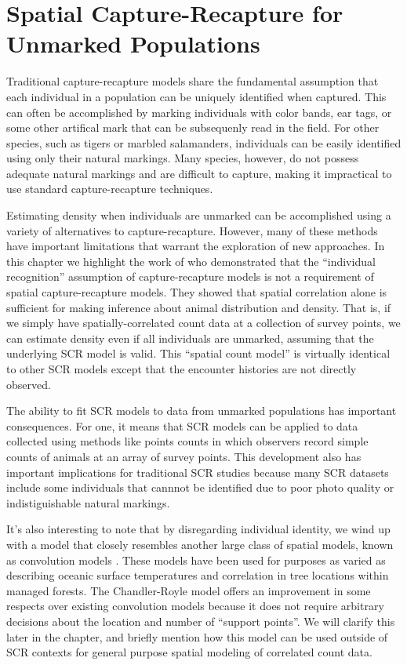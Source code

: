 


\chapter{Spatial Capture-Recapture for Unmarked Populations}
\label{Chapt.scr-unmarked}

\vspace{0.3cm}


Traditional capture-recapture models share the fundamental
assumption that each individual in a population can be uniquely
identified when captured. This can often be accomplished
by marking individuals with color bands, ear tags, or some other
artifical mark that can be subsequenly read in the field. For other species, such as
tigers or marbled salamanders, individuals can be easily identified
using only their natural markings. Many species, however,
do not possess adequate natural markings and are
difficult to capture, making it impractical to use standard
capture-recapture techniques.

Estimating density when individuals are unmarked can be accomplished
using a variety of alternatives to capture-recapture. However, many of
these methods have important limitations that warrant the exploration
of new approaches.
In this chapter we highlight the work of \citet{chandler_royle:2012}
who demonstrated that the ``individual recognition'' assumption of
capture-recapture models is not a requirement of spatial capture-recapture
models. They showed that spatial correlation alone is sufficient for
making inference about animal distribution and density. That is, if
we simply have spatially-correlated
count data at a collection of survey points, we can estimate density
even if all individuals are unmarked, assuming that the underlying SCR
model is valid. This ``spatial count model'' is virtually identical to
other SCR models except that the encounter histories are not directly
observed.

The ability to fit
SCR models to data from unmarked populations has important
consequences. For one, it means that SCR models can
be applied to data collected using methods like points counts in which
observers record simple counts of animals at an array of survey
points. This development also has important implications for
traditional SCR studies because many SCR datasets include some
individuals that cannnot be identified due to poor photo quality or
indistiguishable natural markings.

It's also interesting to note that by disregarding individual
identity, we wind up with a model that closely resembles another large
class of spatial models, known as convolution models
\citep{wolpert_ickstadt:1998,higdon:1998}. These
models have been used for purposes as varied as describing oceanic
surface temperatures and correlation in tree locations within managed
forests. The Chandler-Royle model offers an improvement in
some respects over existing convolution models because it does not
require arbitrary decisions about the location and number of ``support
points''. We will clarify this later in the chapter, and briefly
mention how this model can be used outside of SCR contexts for general
purpose spatial modeling of correlated count data.


